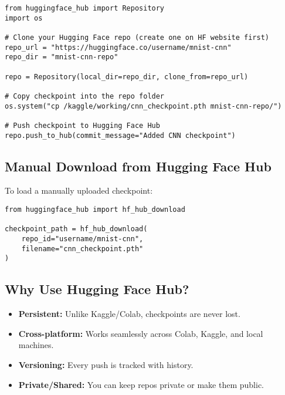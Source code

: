 \begin{tcolorbox}[colback=orange!5!white, colframe=orange!85!black, title=Manual Push to Hugging Face Hub]
\begin{verbatim}
from huggingface_hub import Repository
import os

# Clone your Hugging Face repo (create one on HF website first)
repo_url = "https://huggingface.co/username/mnist-cnn"
repo_dir = "mnist-cnn-repo"

repo = Repository(local_dir=repo_dir, clone_from=repo_url)

# Copy checkpoint into the repo folder
os.system("cp /kaggle/working/cnn_checkpoint.pth mnist-cnn-repo/")

# Push checkpoint to Hugging Face Hub
repo.push_to_hub(commit_message="Added CNN checkpoint")
\end{verbatim}
\end{tcolorbox}

\subsection{Manual Download from Hugging Face Hub}
To load a manually uploaded checkpoint:

\begin{tcolorbox}[colback=red!5!white, colframe=red!75!black, title=Manual Download Example]
\begin{verbatim}
from huggingface_hub import hf_hub_download

checkpoint_path = hf_hub_download(
    repo_id="username/mnist-cnn", 
    filename="cnn_checkpoint.pth"
)
\end{verbatim}
\end{tcolorbox}

\subsection{Why Use Hugging Face Hub?}
\begin{itemize}
    \item \textbf{Persistent:} Unlike Kaggle/Colab, checkpoints are never lost.
    \item \textbf{Cross-platform:} Works seamlessly across Colab, Kaggle, and local machines.
    \item \textbf{Versioning:} Every push is tracked with history.
    \item \textbf{Private/Shared:} You can keep repos private or make them public.
\end{itemize}

